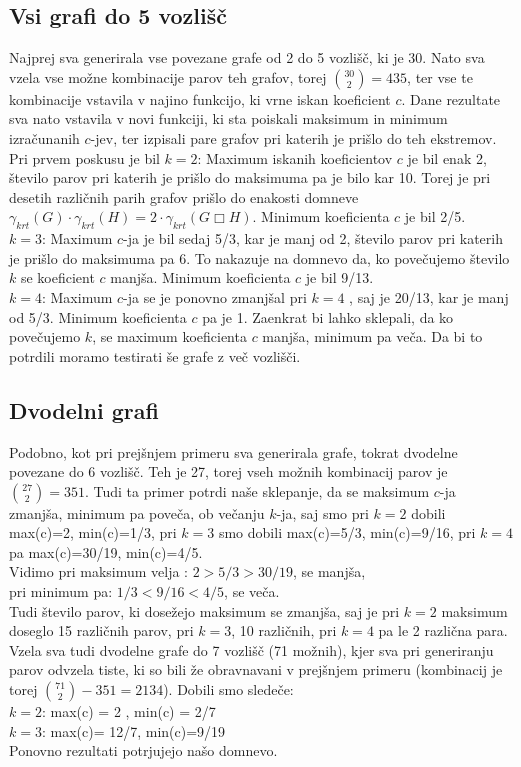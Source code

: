 \documentclass[12pt, a4paper]{article}
\begin{document}
\subsection{Vsi grafi do 5 vozlišč}
Najprej sva generirala vse povezane grafe od 2 do 5 vozlišč, ki je 30. Nato sva vzela vse možne kombinacije parov teh grafov, torej $\binom{30}{2}=435$, ter vse te kombinacije vstavila v najino funkcijo, ki vrne iskan koeficient $c$. Dane rezultate sva nato vstavila v novi funkciji, ki sta poiskali maksimum in minimum izračunanih $c$-jev, ter izpisali pare grafov pri katerih je prišlo do teh ekstremov. \\
Pri prvem poskusu je bil $k=2$: Maximum iskanih koeficientov $c$ je bil enak 2, število parov pri katerih je prišlo do maksimuma pa je bilo kar 10. Torej je pri desetih različnih parih grafov prišlo do enakosti domneve $\gamma_{krt}(G) \cdot \gamma_{krt}(H) = 2 \cdot \gamma_{krt}(G \Box H)$. Minimum koeficienta $c$ je bil 2/5. \\
$k=3$:  Maximum $c$-ja je bil sedaj 5/3, kar je manj od 2, število parov pri katerih je prišlo do maksimuma pa 6. To nakazuje na domnevo da, ko povečujemo število $k$ se koeficient $c$ manjša. Minimum koeficienta $c$ je bil 9/13. \\
$k=4$: Maximum $c$-ja se je ponovno zmanjšal pri $k=4$ , saj je 20/13, kar je manj od 5/3. Minimum koeficienta $c$ pa je 1.
Zaenkrat bi lahko sklepali, da ko povečujemo $k$, se maximum koeficienta $c$ manjša, minimum pa veča. Da bi to potrdili moramo testirati še grafe z več vozlišči. \\

\subsection{Dvodelni grafi}
Podobno, kot pri prejšnjem primeru sva generirala grafe, tokrat dvodelne povezane do 6 vozlišč. Teh je 27, torej vseh možnih kombinacij parov je $\binom{27}{2}=351$. Tudi ta primer potrdi naše sklepanje, da se maksimum $c$-ja zmanjša, minimum pa poveča, ob večanju $k$-ja, saj smo pri $k=2$ dobili max(c)=2, min(c)=1/3, pri $k=3$ smo dobili max(c)=5/3, min(c)=9/16, pri $k=4$ pa max(c)=30/19, min(c)=4/5. \\
Vidimo pri maksimum velja : $2>5/3>30/19$, se manjša, \\
pri minimum pa: $1/3<9/16<4/5$, se veča. \\
Tudi število parov, ki dosežejo maksimum se zmanjša, saj je pri $k=2$ maksimum doseglo 15 različnih parov, pri $k=3$, 10 različnih, pri $k=4$ pa le 2 različna para. \\
Vzela sva tudi dvodelne grafe do 7 vozlišč (71 možnih), kjer sva pri generiranju parov odvzela tiste, ki so bili že obravnavani v prejšnjem primeru (kombinacij je torej $\binom{71}{2} - 351=2134$). Dobili smo sledeče: \\
$k=2$:  max(c) = 2 , min(c) = 2/7 \\
$k=3$:  max(c)= 12/7,  min(c)=9/19 \\
Ponovno rezultati potrjujejo našo domnevo.
\end{document}
